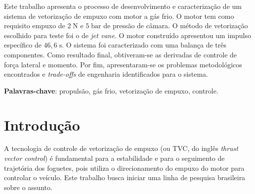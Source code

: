 \documentclass[
	article,			%
	10pt,				%
	oneside,			%
	a4paper,			%
  twocolumn,			%
	english,			%
	brazil,				%
	sumario=tradicional,
	]{abntex2}
\begin{document}

\frenchspacing


\maketitle

\begin{resumoumacoluna}
Este trabalho apresenta o processo de desenvolvimento e caracterização de um sistema de vetorização de empuxo com motor a gás frio. O motor tem como requisito empuxo de \(2\;\mathrm{N}\) e \(5\;\mathrm{bar}\) de pressão de câmara. O método de vetorização escolhido para teste foi o de \textit{jet vane}. O motor construído apresentou um impulso específico de \(46,6\;\mathrm{s}\). O sistema foi caracterizado com uma balança de três componentes. Como resultado final, obtiveram-se as derivadas de controle de força lateral e momento. Por fim, apresentaram-se os problemas metodológicos encontrados e \textit{trade-offs} de engenharia identificados para o sistema.
 \vspace{\onelineskip}

 \noindent
 \textbf{Palavras-chave}: propulsão, gás frio, vetorização de empuxo, controle.
\end{resumoumacoluna}

\textual
\section{Introdução}

A tecnologia de controle de vetorização de empuxo (ou TVC, do inglês \textit{thrust vector control}) é fundamental para a estabilidade e para o seguimento de trajetória dos foguetes, pois utiliza o direcionamento do empuxo do motor para controlar o veículo. Este trabalho busca iniciar uma linha de pesquisa brasileira sobre o assunto.
\end{document}
